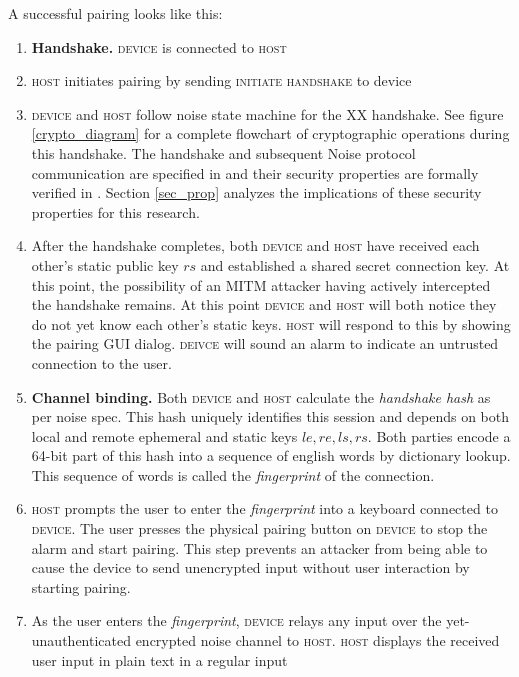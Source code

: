 \documentclass[12pt,a4paper,notitlepage]{article}
\begin{document}
A successful pairing looks like this:
\begin{enumerate}
\item \textbf{Handshake.} \textsc{device} is connected to \textsc{host}
\item \textsc{host} initiates pairing by sending \textsc{initiate handshake} to device
\item \textsc{device} and \textsc{host} follow noise state machine for the \textsc{XX} handshake. See figure
	\ref{crypto_diagram} for a complete flowchart of cryptographic operations during this handshake. The handshake and
	subsequent Noise protocol communication are specified in \textcite{perrin01} and their security properties are
	formally verified in \textcite{kobeissi01}. Section \ref{sec_prop} analyzes the implications of these security
	properties for this research.
\item After the handshake completes, both \textsc{device} and \textsc{host} have received each other's static public key
    $rs$ and established a shared secret connection key. At this point, the possibility of an MITM attacker having
	actively intercepted the handshake remains. At this point \textsc{device} and \textsc{host} will both notice they do
	not yet know each other's static keys. \textsc{host} will respond to this by showing the pairing GUI dialog.
	\textsc{deivce} will sound an alarm to indicate an untrusted connection to the user.
\item \textbf{Channel binding.} Both \textsc{device} and \textsc{host} calculate the \emph{handshake hash} as per noise
	spec\cite{perrin01}. This hash uniquely identifies this session and depends on both local and remote ephemeral and
	static keys $le, re, ls, rs$.  Both parties encode a 64-bit part of this hash into a sequence of english words by
	dictionary lookup. This sequence of words is called the \emph{fingerprint} of the connection.
\item \textsc{host} prompts the user to enter the \emph{fingerprint} into a keyboard connected to \textsc{device}. The
	user presses the physical pairing button on \textsc{device} to stop the alarm and start pairing. This step prevents
	an attacker from being able to cause the device to send unencrypted input without user interaction by starting
	pairing.
\item As the user enters the \emph{fingerprint}, \textsc{device} relays any input over the yet-unauthenticated encrypted
    noise channel to \textsc{host}. \textsc{host} displays the received user input in plain text in a regular input

\end{enumerate}
\end{document}
